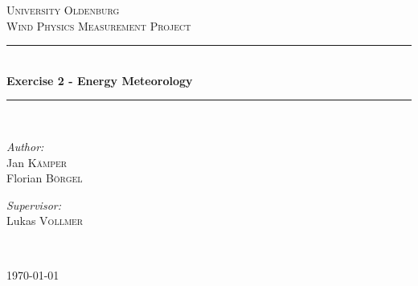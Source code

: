 \begin{titlepage}
\begin{center}


\textsc{\LARGE University Oldenburg}\\[1.5cm]

\textsc{\Large Wind Physics Measurement Project}\\[0.5cm]


\newcommand{\HRule}{\rule{\linewidth}{0.5mm}}
\HRule \\[0.4cm]
{ \huge \bfseries Exercise 2 - Energy Meteorology}\\[0.4cm]

\HRule \\[1.5cm]

\begin{minipage}{0.4\textwidth}
\begin{flushleft} \large
\emph{Author:}\\
Jan \textsc{K\"amper}\\
Florian \textsc{B\"orgel}
\end{flushleft}
\end{minipage}
\hfill
\begin{minipage}{0.4\textwidth}
\begin{flushright} \large
\emph{Supervisor:} \\
Lukas \textsc{Vollmer}
\end{flushright}
\end{minipage}
\\[3cm]
\vfill



{\large \today}

\end{center}

\end{titlepage}